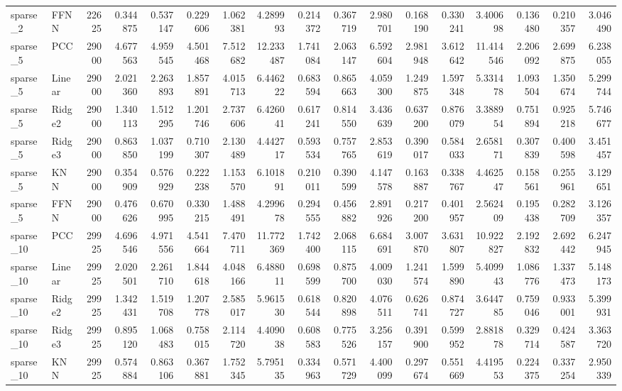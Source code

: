 \begin{tabular}{llrrrrrrrrrrrrrrr}
sparse_2 & FFNN & 22625 & 0.344875 & 0.537147 & 0.229606 & 1.062381 & 4.289993 & 0.214372 & 0.367719 & 2.980701 & 0.168190 & 0.330241 & 3.400698 & 0.136480 & 0.210357 & 3.046490 \\
sparse_5 & PCC & 29000 & 4.677563 & 4.959545 & 4.501468 & 7.512682 & 12.233487 & 1.741084 & 2.063147 & 6.592604 & 2.981948 & 3.612642 & 11.414546 & 2.206092 & 2.699875 & 6.238055 \\
sparse_5 & Linear & 29000 & 2.021360 & 2.263893 & 1.857891 & 4.015713 & 6.446222 & 0.683594 & 0.865663 & 4.059300 & 1.249875 & 1.597348 & 5.331478 & 1.093504 & 1.350674 & 5.299744 \\
sparse_5 & Ridge2 & 29000 & 1.340113 & 1.512295 & 1.201746 & 2.737606 & 6.426041 & 0.617241 & 0.814550 & 3.436639 & 0.637200 & 0.876079 & 3.388954 & 0.751894 & 0.925218 & 5.746677 \\
sparse_5 & Ridge3 & 29000 & 0.863850 & 1.037199 & 0.710307 & 2.130489 & 4.442717 & 0.593534 & 0.757765 & 2.853619 & 0.390017 & 0.584033 & 2.658171 & 0.307839 & 0.400598 & 3.451457 \\
sparse_5 & KNN & 29000 & 0.354909 & 0.576929 & 0.222238 & 1.153570 & 6.101891 & 0.210011 & 0.390599 & 4.147578 & 0.163887 & 0.338767 & 4.462547 & 0.158561 & 0.255961 & 3.129651 \\
sparse_5 & FFNN & 29000 & 0.476626 & 0.670995 & 0.330215 & 1.488491 & 4.299678 & 0.294555 & 0.456882 & 2.891926 & 0.217200 & 0.401957 & 2.562409 & 0.195438 & 0.282709 & 3.126357 \\
sparse_10 & PCC & 29925 & 4.696546 & 4.971556 & 4.541664 & 7.470711 & 11.772369 & 1.742400 & 2.068115 & 6.684691 & 3.007870 & 3.631807 & 10.922827 & 2.192832 & 2.692442 & 6.247945 \\
sparse_10 & Linear & 29925 & 2.020501 & 2.261710 & 1.844618 & 4.048166 & 6.488011 & 0.698599 & 0.875700 & 4.009030 & 1.241574 & 1.599890 & 5.409943 & 1.086776 & 1.337473 & 5.148173 \\
sparse_10 & Ridge2 & 29925 & 1.342431 & 1.519708 & 1.207778 & 2.585017 & 5.961530 & 0.618544 & 0.820898 & 4.076511 & 0.626741 & 0.874727 & 3.644785 & 0.759046 & 0.933001 & 5.399931 \\
sparse_10 & Ridge3 & 29925 & 0.895120 & 1.068483 & 0.758015 & 2.114720 & 4.409038 & 0.608583 & 0.775526 & 3.256157 & 0.391900 & 0.599952 & 2.881878 & 0.329714 & 0.424587 & 3.363720 \\
sparse_10 & KNN & 29925 & 0.574884 & 0.863106 & 0.367881 & 1.752345 & 5.795135 & 0.334963 & 0.571729 & 4.400099 & 0.297674 & 0.551669 & 4.419553 & 0.224375 & 0.337254 & 2.950339 \\

\end{tabular}
